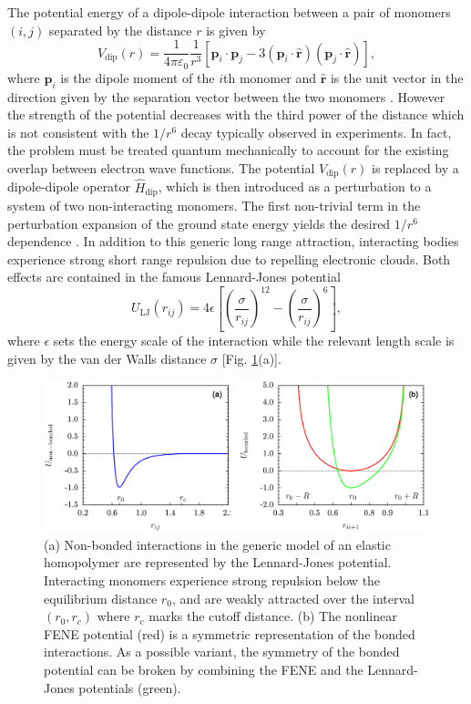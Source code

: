 \documentclass[12pt]{report}
\begin{document}
The potential energy of a dipole-dipole interaction between a pair of monomers $(i,j)$ separated by the distance $r$ is given by 
\begin{equation}
V_{\mathrm{dip}}(r) = \frac{1}{4\pi \varepsilon _{0} }\frac{1}{r^{3}} \left[\mathbf{p}_{i}\cdot \mathbf{p}_{j} - 3\left(\mathbf{p}_{i}\cdot \hat{\mathbf{r}}\right)\left(\mathbf{p}_{j}\cdot \hat{\mathbf{r}}\right)\right],
\end{equation}
where $\mathbf{p}_{i}$ is the dipole moment of the $i$th monomer and $\hat{\mathbf{r}}$ is the unit vector in the direction given by the separation vector between the two monomers \cite{Griffiths1999}. However the strength of the potential decreases with the third power of the distance which is not consistent with the $1/r^{6}$ decay typically observed in experiments. In fact, the problem must be treated quantum mechanically to account for the existing overlap between electron wave functions. The potential $V_{\mathrm{dip}}(r)$ is replaced by a dipole-dipole operator $\hat{H}_{\mathrm{dip}}$, which is then introduced as a perturbation to a system of two non-interacting monomers. The first non-trivial term in the perturbation expansion of the ground state energy yields the desired $1/r^{6}$ dependence \cite{Bachmann2014}. In addition to this generic long range attraction, interacting bodies experience strong short range repulsion due to repelling electronic clouds. Both effects are contained in the famous Lennard-Jones potential \cite{Lennard-Jones1931}
%
\begin{equation}
U_{\mathrm{LJ}}(r_{ij})= 4\epsilon \left[ \left(
\frac{\sigma}{r_{ij}} \right)^{12} - 			\left(
\frac{\sigma}{r_{ij}} \right)^{6} \right], 
\label{eq:LJ1}
\end{equation}
%
where $\epsilon$  sets the energy scale of the interaction while the relevant length scale is given by the van der Walls distance $\sigma$ [Fig.\,\,\ref{fig:potentials}(a)].
 
%
\begin{figure}
\center
\includegraphics[width = 1.01\textwidth]{chapter4Figs/potentialLarge.eps}
\caption{\label{fig:potentials}%
(a) Non-bonded interactions in the generic model of an elastic homopolymer are represented by the Lennard-Jones potential. Interacting monomers experience strong repulsion below the equilibrium distance $r_{0}$, and are weakly attracted over the interval $(r_{0},r_{c})$ where $r_{c}$ marks the cutoff distance.\,\,(b) The nonlinear FENE potential (red) is a symmetric representation of the bonded interactions. As a possible variant, the symmetry of the bonded potential can be broken by combining the FENE and the Lennard-Jones potentials (green).}
\end{figure}
% 
\end{document}
